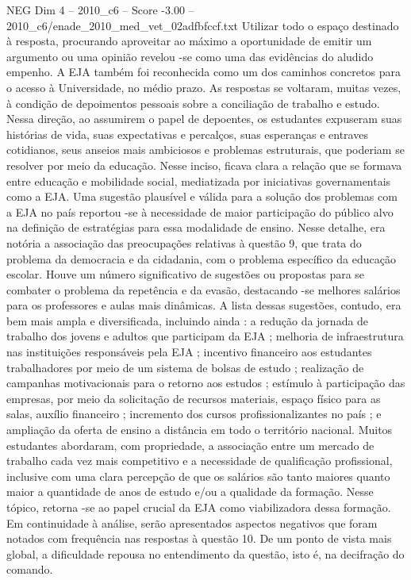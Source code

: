 \begin{textsample}{NEG Dim 4 – 2010\_c6 – Score -3.00 – 2010\_c6/enade\_2010\_med\_vet\_02adfbfccf.txt}
Utilizar todo o espaço destinado à resposta, procurando aproveitar ao máximo a oportunidade de emitir um argumento ou uma opinião revelou -se como uma das evidências do aludido empenho.
A EJA também foi reconhecida como um dos caminhos concretos para o acesso à Universidade, no médio prazo.
As respostas se voltaram, muitas vezes, à condição de depoimentos pessoais sobre a conciliação de trabalho e estudo.
Nessa direção, ao assumirem o papel de depoentes, os estudantes expuseram suas histórias de vida, suas expectativas e percalços, suas esperanças e entraves cotidianos, seus anseios mais ambiciosos e problemas estruturais, que poderiam se resolver por meio da educação.
Nesse inciso, ficava clara a relação que se formava entre educação e mobilidade social, mediatizada por iniciativas governamentais como a EJA.
Uma sugestão plausível e válida para a solução dos problemas com a EJA no país reportou -se à necessidade de maior participação do público alvo na definição de estratégias para essa modalidade de ensino.
Nesse detalhe, era notória a associação das preocupações relativas à questão 9, que trata do problema da democracia e da cidadania, com o problema específico da educação escolar.
Houve um número significativo de sugestões ou propostas para se combater o problema da repetência e da evasão, destacando -se melhores salários para os professores e aulas mais dinâmicas.
A lista dessas sugestões, contudo, era bem mais ampla e diversificada, incluindo ainda : a redução da jornada de trabalho dos jovens e adultos que participam da EJA ; melhoria de infraestrutura nas instituições responsáveis pela EJA ; incentivo financeiro aos estudantes trabalhadores por meio de um sistema de bolsas de estudo ; realização de campanhas motivacionais para o retorno aos estudos ; estímulo à participação das empresas, por meio da solicitação de recursos materiais, espaço físico para as salas, auxílio financeiro ; incremento dos cursos profissionalizantes no país ; e ampliação da oferta de ensino a distância em todo o território nacional.
Muitos estudantes abordaram, com propriedade, a associação entre um mercado de trabalho cada vez mais competitivo e a necessidade de qualificação profissional, inclusive com uma clara percepção de que os salários são tanto maiores quanto maior a quantidade de anos de estudo e/ou a qualidade da formação.
Nesse tópico, retorna -se ao papel crucial da EJA como viabilizadora dessa formação.
Em continuidade à análise, serão apresentados aspectos negativos que foram notados com frequência nas respostas à questão 10.
De um ponto de vista mais global, a dificuldade repousa no entendimento da questão, isto é, na decifração do comando.

\end{textsample}
